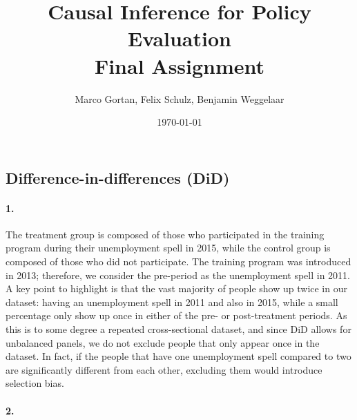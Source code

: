 \documentclass{scrartcl}
\title{Causal Inference for Policy Evaluation\\
\Large{Final Assignment}}
\author{Marco Gortan, Felix Schulz, Benjamin Weggelaar}
\date{\today}
\begin{document}
\maketitle



\subsection*{Difference-in-differences (DiD)}

\paragraph*{1.}
The treatment group is composed of those who participated in the training program during their unemployment spell in 2015, while the control group is composed of those who did not participate. The training program was introduced in 2013; therefore, we consider the pre-period as the unemployment spell in 2011. \\

A key point to highlight is that the vast majority of people show up twice in our dataset: having an unemployment spell in 2011 and also in 2015, while a small percentage only show up once in either of the pre- or post-treatment periods. As this is to some degree a repeated cross-sectional dataset, and since DiD allows for unbalanced panels, we do not exclude people that only appear once in the dataset. In fact, if the people that have one unemployment spell compared to two are significantly different from each other, excluding them would introduce selection bias. 

\paragraph*{2.}

 

\end{document}

